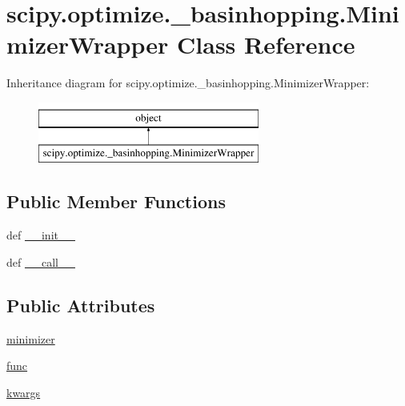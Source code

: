 \hypertarget{classscipy_1_1optimize_1_1__basinhopping_1_1MinimizerWrapper}{}\section{scipy.\+optimize.\+\_\+basinhopping.\+Minimizer\+Wrapper Class Reference}
\label{classscipy_1_1optimize_1_1__basinhopping_1_1MinimizerWrapper}
Inheritance diagram for scipy.\+optimize.\+\_\+basinhopping.\+Minimizer\+Wrapper\+:\begin{figure}[H]
\begin{center}
\leavevmode
\includegraphics[height=2.000000cm]{classscipy_1_1optimize_1_1__basinhopping_1_1MinimizerWrapper}
\end{center}
\end{figure}
\subsection*{Public Member Functions}
\begin{DoxyCompactItemize}
\item 
def \hyperlink{classscipy_1_1optimize_1_1__basinhopping_1_1MinimizerWrapper_aa22eb996b0e9e5adb4de074fb76fdfea}{\+\_\+\+\_\+init\+\_\+\+\_\+}
\item 
def \hyperlink{classscipy_1_1optimize_1_1__basinhopping_1_1MinimizerWrapper_aace19ad7f0dda52b3075ab191ecebc30}{\+\_\+\+\_\+call\+\_\+\+\_\+}
\end{DoxyCompactItemize}
\subsection*{Public Attributes}
\begin{DoxyCompactItemize}
\item 
\hyperlink{classscipy_1_1optimize_1_1__basinhopping_1_1MinimizerWrapper_a37c13256f2724eacd50f5a1a5bfc47eb}{minimizer}
\item 
\hyperlink{classscipy_1_1optimize_1_1__basinhopping_1_1MinimizerWrapper_add644cb78613b1b95178d4a690ea77fc}{func}
\item 
\hyperlink{classscipy_1_1optimize_1_1__basinhopping_1_1MinimizerWrapper_ab8236ab1ea2d705ed7b6a7ff9ed57519}{kwargs}
\end{DoxyCompactItemize}


